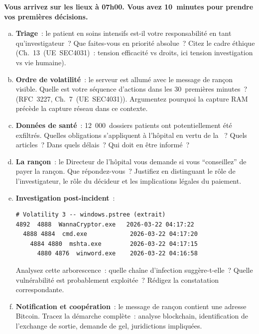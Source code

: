 \begin{boxexo}[title={\ding{45}\quad NTEM. Décisions immédiate et médiate}]
\textbf{Vous arrivez sur les lieux à 07h00. Vous avez 10~minutes
pour prendre vos premières décisions.}

\begin{enumerate}[(a)]
    \item \textbf{Triage}~: le patient en soins intensifs est-il
          votre responsabilité en tant qu'investigateur~?
          Que faites-vous en priorité absolue~? Citez le cadre
          éthique (Ch.~13~(UE~SEC4031)~: tension efficacité
          vs droits, ici tension investigation vs vie humaine).
    \item \textbf{Ordre de volatilité}~: le serveur est allumé
          avec le message de rançon visible. Quelle est votre
          séquence d'actions dans les 30~premières minutes~?
          (RFC~3227, Ch.~7~(UE~SEC4031)). Argumentez pourquoi
          la capture RAM précède la capture réseau dans ce contexte.
    \item \textbf{Données de santé}~: 12~000~dossiers patients
          ont potentiellement été exfiltrés. Quelles obligations
          s'appliquent à l'hôpital en vertu de la
          ~? Quels articles~? Dans quels délais~?
          Qui doit en être informé~?
    \item \textbf{La rançon}~: le Directeur de l'hôpital vous
          demande si vous ``conseillez'' de payer la rançon.
          Que répondez-vous~? Justifiez en distinguant le rôle
          de l'investigateur, le rôle du décideur et les
          implications légales du paiement.
    \item \textbf{Investigation post-incident}~:
\begin{lstlisting}[language=bash_forensique]
# Volatility 3 -- windows.pstree (extrait)
4892  4888  WannaCryptor.exe   2026-03-22 04:17:22
  4888 4884  cmd.exe            2026-03-22 04:17:20
    4884 4880  mshta.exe        2026-03-22 04:17:15
      4880 4876  winword.exe    2026-03-22 04:16:58
\end{lstlisting}
          Analysez cette arborescence~: quelle chaîne d'infection
          suggère-t-elle~? Quelle vulnérabilité est probablement
          exploitée~? Rédigez la constatation correspondante.
    \item \textbf{Notification et coopération}~: le message de
          rançon contient une adresse Bitcoin. Tracez la démarche
          complète~: analyse blockchain, identification de l'exchange
          de sortie, demande de gel, juridictions impliquées.
\end{enumerate}
\end{boxexo}

